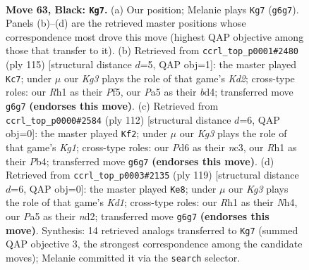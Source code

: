 \documentclass[11pt]{article}
\begin{document}
\clearpage

\begin{figure}[p]\centering
\begin{subfigure}{0.46\textwidth}\centering
\resizebox{\linewidth}{!}{%
\newchessgame
\chessboard[
  setfen={8/8/2pp2k1/p7/8/6K1/8/7r b - - 5 63},
  showmover=false,
  pgfstyle=straightmove, color=movearrow, markmove={g6-g7}
]}
\caption{}
\end{subfigure}\hfill
\begin{subfigure}{0.46\textwidth}\centering
\resizebox{\linewidth}{!}{%
\newchessgame
\chessboard[
  setfen={8/3k4/8/1P3p2/p2B4/7K/8/8 b - - 1 58},
  showmover=false,
  pgfstyle=straightmove, color=movearrow, markmove={d7-c7}
]}
\caption{}
\end{subfigure}
\\[4pt]
\begin{subfigure}{0.46\textwidth}\centering
\resizebox{\linewidth}{!}{%
\newchessgame
\chessboard[
  setfen={8/8/3k4/5p2/1P6/2n3P1/8/6K1 w - - 6 57},
  showmover=false,
  pgfstyle=straightmove, color=movearrow, markmove={g1-f2}
]}
\caption{}
\end{subfigure}\hfill
\begin{subfigure}{0.46\textwidth}\centering
\resizebox{\linewidth}{!}{%
\newchessgame
\chessboard[
  setfen={3k4/8/8/1p2K3/7n/3p4/3N4/8 b - - 11 60},
  showmover=false,
  pgfstyle=straightmove, color=movearrow, markmove={d8-e8}
]}
\caption{}
\end{subfigure}
\caption{\textbf{Move 63, Black: \texttt{Kg7}.} (a) Our position; Melanie plays \texttt{Kg7} (\texttt{g6g7}). Panels (b)--(d) are the retrieved master positions whose correspondence most drove this move (highest QAP objective among those that transfer to it). (b) Retrieved from \texttt{ccrl\_top\_p0001\#2480} (ply 115) [structural distance $d$=5, QAP obj=1]: the master played \texttt{Kc7}; under $\mu$ our \emph{Kg3} plays the role of that game's \emph{Kd2}; cross-type roles: our \emph{R}h1 as their \emph{P}f5, our \emph{P}a5 as their \emph{b}d4; transferred move \texttt{g6g7} \textbf{(endorses this move)}. (c) Retrieved from \texttt{ccrl\_top\_p0000\#2584} (ply 112) [structural distance $d$=6, QAP obj=0]: the master played \texttt{Kf2}; under $\mu$ our \emph{Kg3} plays the role of that game's \emph{Kg1}; cross-type roles: our \emph{P}d6 as their \emph{n}c3, our \emph{R}h1 as their \emph{P}b4; transferred move \texttt{g6g7} \textbf{(endorses this move)}. (d) Retrieved from \texttt{ccrl\_top\_p0003\#2135} (ply 119) [structural distance $d$=6, QAP obj=0]: the master played \texttt{Ke8}; under $\mu$ our \emph{Kg3} plays the role of that game's \emph{Kd1}; cross-type roles: our \emph{R}h1 as their \emph{N}h4, our \emph{P}a5 as their \emph{n}d2; transferred move \texttt{g6g7} \textbf{(endorses this move)}. Synthesis: 14 retrieved analogs transferred to \texttt{Kg7} (summed QAP objective 3, the strongest correspondence among the candidate moves); Melanie committed it via the \texttt{search} selector.}
\label{fig:thought-m125}
\end{figure}
\end{document}

